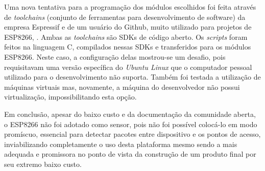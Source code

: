 Uma nova tentativa para a programação  dos módulos escolhidos foi feita através de
\emph{toolchains} (conjunto de ferramentas para desenvolvimento de software) da
empresa Espressif e de um usuário do Github, muito utilizado para
projetos de ESP8266, . Ambas as \emph{toolchains}
são SDKs de código aberto. Os \emph{scripts} foram feitos na linguagem C,
compilados nessas SDKs e transferidos para os módulos ESP8266. Neste caso,
a configuração delas mostrou-se um desafio, pois requisitavam uma versão
específica do \emph{Ubuntu Linux} que o computador pessoal utilizado para o desenvolvimento
não suporta. Também foi testada a utilização de máquinas virtuais mas, novamente,
a máquina do desenvolvedor não possui virtualização, impossibilitando esta opção.

Em conclusão, apesar do baixo custo e da documentação da comunidade aberta, o
ESP8266 não foi adotado como sensor, pois não foi possível colocá-lo em modo
promíscuo, essencial para detectar pacotes entre dispositivo e os pontos de
acesso, inviabilizando completamente o uso desta plataforma mesmo sendo a
mais adequada e promissora no ponto de vista da construção de um produto final
por seu extremo baixo custo.
